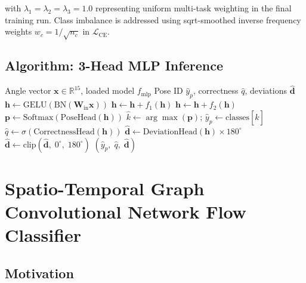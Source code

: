 \documentclass[conference]{IEEEtran}
\begin{document}
\noindent with $\lambda_1 = \lambda_2 = \lambda_3 = 1.0$ representing uniform multi-task weighting in the final training run. Class imbalance is addressed using sqrt-smoothed inverse frequency weights $w_c = 1/\sqrt{n_c}$ in $\mathcal{L}_{\mathrm{CE}}$.

\subsection{Algorithm: 3-Head MLP Inference}

\begin{algorithm}[ht]
\caption{3-Head ResMLP Inference}
\label{alg:mlp}
\begin{algorithmic}[1]
\Require Angle vector $\mathbf{x} \in \mathbb{R}^{15}$, loaded model $f_{\mathrm{mlp}}$
\Ensure Pose ID $\hat{y}_p$, correctness $\hat{q}$, deviations $\hat{\mathbf{d}}$
\State $\mathbf{h} \leftarrow \mathrm{GELU}(\mathrm{BN}(\mathbf{W}_{\mathrm{in}}\mathbf{x}))$
\State $\mathbf{h} \leftarrow \mathbf{h} + f_1(\mathbf{h})$
\State $\mathbf{h} \leftarrow \mathbf{h} + f_2(\mathbf{h})$
\State $\mathbf{p} \leftarrow \mathrm{Softmax}(\mathrm{PoseHead}(\mathbf{h}))$
\State $\hat{k} \leftarrow \arg\max(\mathbf{p})$;\quad
       $\hat{y}_p \leftarrow \mathrm{classes}[\hat{k}]$
\State $\hat{q} \leftarrow \sigma(\mathrm{CorrectnessHead}(\mathbf{h}))$
\State $\hat{\mathbf{d}} \leftarrow \mathrm{DeviationHead}(\mathbf{h}) \times 180^{\circ}$
\State $\hat{\mathbf{d}} \leftarrow \mathrm{clip}(\hat{\mathbf{d}},\; 0^{\circ},\; 180^{\circ})$
\State \Return $(\hat{y}_p,\; \hat{q},\; \hat{\mathbf{d}})$
\end{algorithmic}
\end{algorithm}

\section{Spatio-Temporal Graph Convolutional Network Flow Classifier}
\label{sec:sequence}

\subsection{Motivation}
\end{document}
